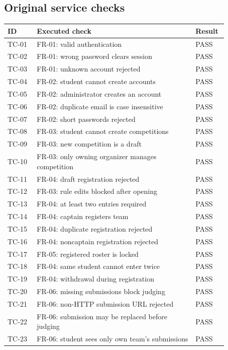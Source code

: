 \subsection*{Original service checks}
\small\begin{longtable}{p{0.12\linewidth}p{0.65\linewidth}p{0.1\linewidth}}\toprule ID & Executed check & Result\\\midrule\endhead
TC-01 & FR-01: valid authentication & PASS\\
TC-02 & FR-01: wrong password clears session & PASS\\
TC-03 & FR-01: unknown account rejected & PASS\\
TC-04 & FR-02: student cannot create accounts & PASS\\
TC-05 & FR-02: administrator creates an account & PASS\\
TC-06 & FR-02: duplicate email is case insensitive & PASS\\
TC-07 & FR-02: short passwords rejected & PASS\\
TC-08 & FR-03: student cannot create competitions & PASS\\
TC-09 & FR-03: new competition is a draft & PASS\\
TC-10 & FR-03: only owning organizer manages competition & PASS\\
TC-11 & FR-04: draft registration rejected & PASS\\
TC-12 & FR-03: rule edits blocked after opening & PASS\\
TC-13 & FR-04: at least two entries required & PASS\\
TC-14 & FR-04: captain registers team & PASS\\
TC-15 & FR-04: duplicate registration rejected & PASS\\
TC-16 & FR-04: noncaptain registration rejected & PASS\\
TC-17 & FR-05: registered roster is locked & PASS\\
TC-18 & FR-04: same student cannot enter twice & PASS\\
TC-19 & FR-04: withdrawal during registration & PASS\\
TC-20 & FR-06: missing submissions block judging & PASS\\
TC-21 & FR-06: non-HTTP submission URL rejected & PASS\\
TC-22 & FR-06: submission may be replaced before judging & PASS\\
TC-23 & FR-06: student sees only own team's submissions & PASS\\

\end{longtable}
